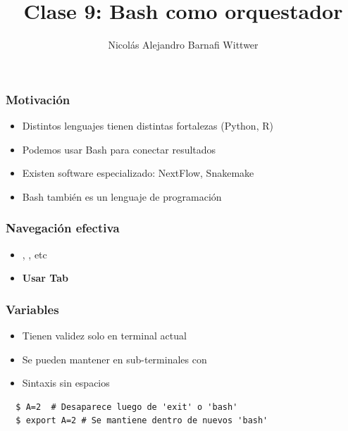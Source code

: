 \documentclass[14pt,aspectratio=169,xcolor=dvipsnames]{beamer}
\title[short title]{Clase 9: Bash como orquestador}
\subtitle{}
\author[NA Barnafi] {Nicolás Alejandro Barnafi Wittwer}
\institute[UC|CMM] 
{
    Pontificia Universidad Católica de Chile \\
    Centro de Modelamiento Matemático
}
\date{}
\begin{document}
\begin{frame}
    \maketitle
\end{frame}
\begin{frame}\frametitle{Motivación}
    \begin{itemize}
        \item Distintos lenguajes tienen distintas fortalezas (Python, R)
        \item Podemos usar Bash para conectar resultados
        \item Existen software especializado: NextFlow, Snakemake
        \item Bash también es un lenguaje de programación
    \end{itemize}
\end{frame}
\begin{frame}\frametitle{Navegación efectiva}
    \begin{itemize}
        \item {}, , etc
        \item \textbf{Usar Tab}
    \end{itemize}

\end{frame}
\begin{frame}[fragile]\frametitle{Variables}
    \begin{itemize}
        \item Tienen validez solo en terminal actual
        \item Se pueden mantener en sub-terminales con 
        \item Sintaxis sin espacios
    \end{itemize}
    
    \begin{verbatim}
  $ A=2  # Desaparece luego de 'exit' o 'bash'
  $ export A=2 # Se mantiene dentro de nuevos 'bash'
    \end{verbatim}
\end{frame}
\end{document}
